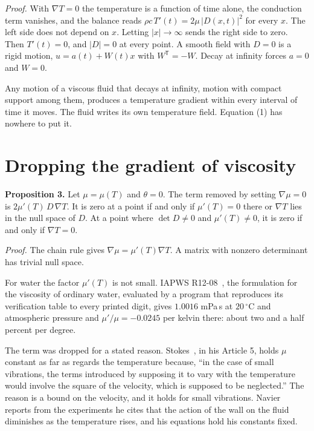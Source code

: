 \emph{Proof.} With $\nabla T = 0$ the temperature is a function of time alone, the conduction term
vanishes, and the balance reads $\rho c\,T'(t) = 2\mu\,|D(x,t)|^2$ for every $x$. The left side does
not depend on $x$. Letting $|x|\to\infty$ sends the right side to zero. Then $T'(t) = 0$, and
$|D| = 0$ at every point. A smooth field with $D = 0$ is a rigid motion, $u = a(t) + W(t)x$ with
$W^{\mathsf T} = -W$. Decay at infinity forces $a = 0$ and $W = 0$. \hfill\qedsymbol

Any motion of a viscous fluid that decays at infinity, motion with compact support among them,
produces a temperature gradient within every interval of time it moves. The fluid writes its own
temperature field. Equation (1) has nowhere to put it.

\section{Dropping the gradient of viscosity}

\textbf{Proposition 3.} Let $\mu = \mu(T)$ and $\theta = 0$. The term removed by setting
$\nabla\mu = 0$ is $2\mu'(T)\,D\,\nabla T$. It is zero at a point if and only if $\mu'(T) = 0$ there
or $\nabla T$ lies in the null space of $D$. At a point where $\det D \neq 0$ and $\mu'(T)\neq 0$, it
is zero if and only if $\nabla T = 0$.

\emph{Proof.} The chain rule gives $\nabla\mu = \mu'(T)\nabla T$. A matrix with nonzero determinant
has trivial null space. \hfill\qedsymbol

For water the factor $\mu'(T)$ is not small. IAPWS R12-08~\cite{src:IAPWS-R12-08}, the formulation for the viscosity of
ordinary water, evaluated by a program that reproduces its verification table to every
printed digit, gives $1.0016$ mPa\,s at $20\,^\circ$C and atmospheric pressure and
$\mu'/\mu = -0.0245$ per kelvin there: about two and a half percent per degree.

The term was dropped for a stated reason. Stokes~\cite{src:Stokes-1845}, in his Article 5, holds
$\mu$ constant as far as regards the temperature because, ``in the case of small vibrations, the
terms introduced by supposing it to vary with the temperature would involve the square of the
velocity, which is supposed to be neglected.'' The reason is a bound on the velocity, and it holds
for small vibrations. Navier~\cite{src:Navier-1827} reports from the experiments he cites that the
action of the wall on the fluid diminishes as the temperature rises, and his equations hold his
constants fixed.

